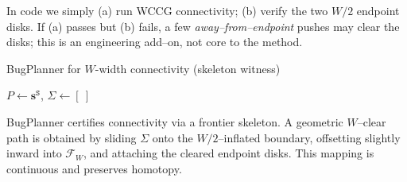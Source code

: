 \begin{remark}
In code we simply (a) run WCCG connectivity; (b) verify the two $W/2$ endpoint disks.
If (a) passes but (b) fails, a few \emph{away–from–endpoint} pushes may clear the disks;
this is an engineering add–on, not core to the method.
\end{remark}


\begin{algorithm}[t]
\small
\caption{BugPlanner for $W$-width connectivity (skeleton witness)}
\label{alg:bugplanner}
\DontPrintSemicolon
{}
$P\leftarrow\mathbf{s}^{\texttt{S}}$, $\Sigma\leftarrow[\ ]$\;
\end{algorithm}

\begin{remark}
BugPlanner certifies connectivity via a frontier skeleton. A geometric $W$–clear path is obtained by sliding $\Sigma$ onto the $W/2$–inflated boundary, offsetting slightly inward into $\mathcal F_W$, and attaching the cleared endpoint disks. This mapping is continuous and preserves homotopy.
\end{remark}